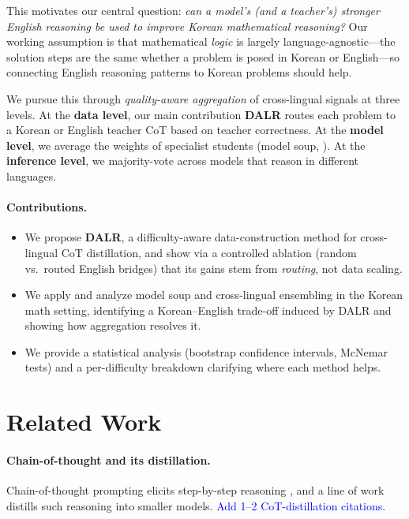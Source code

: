\documentclass{article}
\newcommand{\note}[1]{\textcolor{blue}{{#1}}}
\begin{document}
This motivates our central question: \emph{can a model's (and a
teacher's) stronger English reasoning be used to improve Korean
mathematical reasoning?} Our working assumption is that mathematical
\emph{logic} is largely language-agnostic---the solution steps are the
same whether a problem is posed in Korean or English---so connecting
English reasoning patterns to Korean problems should help.

We pursue this through \emph{quality-aware aggregation} of cross-lingual
signals at three levels. At the \textbf{data level}, our main
contribution \textbf{DALR} routes each problem to a Korean or English
teacher CoT based on teacher correctness. At the \textbf{model level}, we
average the weights of specialist students (model soup,
\citealp{wortsman2022soup}). At the \textbf{inference level}, we
majority-vote across models that reason in different languages.

\paragraph{Contributions.}
\begin{itemize}
  \item We propose \textbf{DALR}, a difficulty-aware data-construction
  method for cross-lingual CoT distillation, and show via a controlled
  ablation (random vs.\ routed English bridges) that its gains stem from
  \emph{routing}, not data scaling.
  \item We apply and analyze model soup and cross-lingual ensembling in
  the Korean math setting, identifying a Korean--English trade-off
  induced by DALR and showing how aggregation resolves it.
  \item We provide a statistical analysis (bootstrap confidence
  intervals, McNemar tests) and a per-difficulty breakdown clarifying
  where each method helps.
\end{itemize}

\section{Related Work}
\label{sec:related}

\paragraph{Chain-of-thought and its distillation.}
Chain-of-thought prompting elicits step-by-step reasoning
\citep{wei2022cot}, and a line of work distills such reasoning into
smaller models. \note{Add 1--2 CoT-distillation citations.}
\end{document}

